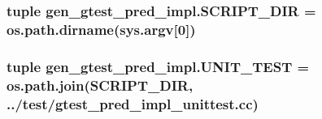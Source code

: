 \subsubsection[{S\+C\+R\+I\+P\+T\+\_\+\+D\+I\+R}]{\setlength{\rightskip}{0pt plus 5cm}tuple gen\+\_\+gtest\+\_\+pred\+\_\+impl.\+S\+C\+R\+I\+P\+T\+\_\+\+D\+I\+R = os.\+path.\+dirname(sys.\+argv\mbox{[}0\mbox{]})}\label{namespacegen__gtest__pred__impl_a60983047285657dc05c7df4189780580}
\hypertarget{namespacegen__gtest__pred__impl_a88e9ea29c82704eab46ccc3e1e3468c8}{}
\subsubsection[{U\+N\+I\+T\+\_\+\+T\+E\+S\+T}]{\setlength{\rightskip}{0pt plus 5cm}tuple gen\+\_\+gtest\+\_\+pred\+\_\+impl.\+U\+N\+I\+T\+\_\+\+T\+E\+S\+T = os.\+path.\+join({\bf S\+C\+R\+I\+P\+T\+\_\+\+D\+I\+R}, \textquotesingle{}../test/gtest\+\_\+pred\+\_\+impl\+\_\+unittest.\+cc\textquotesingle{})}\label{namespacegen__gtest__pred__impl_a88e9ea29c82704eab46ccc3e1e3468c8}
